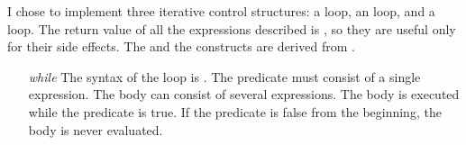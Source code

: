 \begin{exe}[4.9]
    \label{4.9}
    I chose to implement three iterative control structures: a  
    loop, an  loop, and a  loop. The return value of all 
    the expressions described is , so they are useful only for their 
    side effects. The  and the  constructs are derived 
    from .
    \begin{itemize}
        \item[\emph{while}] The syntax of the  loop is
            . The predicate must consist of 
            a single expression. The body can consist of several expressions. 
            The body is executed while the predicate is true. If the predicate 
            is false from the beginning, the body is never evaluated.


\end{itemize}
\end{exe}
